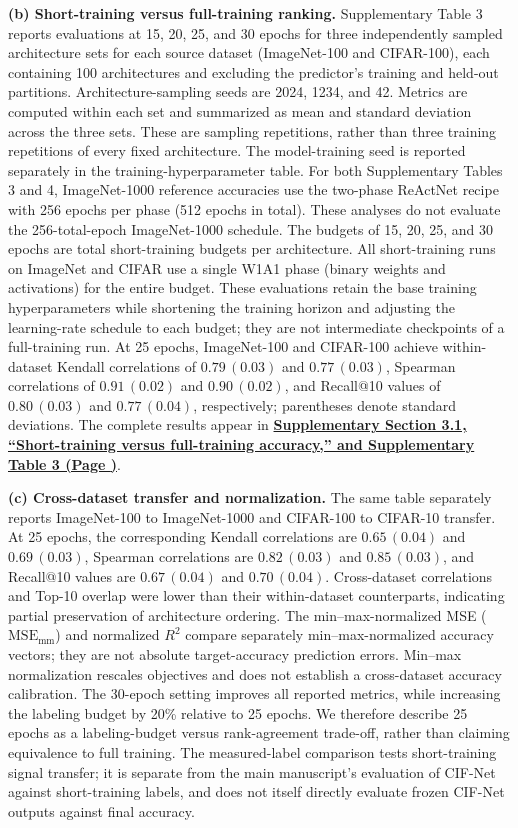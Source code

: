 \documentclass[11pt]{article}
\newcommand{\revloc}[1]{%
  \textcolor{revisionred}{\textbf{\uline{#1}}}}
\begin{document}
\begin{enumerate}[leftmargin=0pt,label={},itemsep=5mm]
\textbf{(b) Short-training versus full-training ranking.} Supplementary Table 3 reports evaluations at 15, 20, 25, and 30 epochs for three independently sampled architecture sets for each source dataset (ImageNet-100 and CIFAR-100), each containing 100 architectures and excluding the predictor's training and held-out partitions. Architecture-sampling seeds are 2024, 1234, and 42. Metrics are computed within each set and summarized as mean and standard deviation across the three sets. These are sampling repetitions, rather than three training repetitions of every fixed architecture. The model-training seed is reported separately in the training-hyperparameter table. For both Supplementary Tables 3 and 4, ImageNet-1000 reference accuracies use the two-phase ReActNet recipe with 256 epochs per phase (512 epochs in total). These analyses do not evaluate the 256-total-epoch ImageNet-1000 schedule. The budgets of 15, 20, 25, and 30 epochs are total short-training budgets per architecture. All short-training runs on ImageNet and CIFAR use a single W1A1 phase (binary weights and activations) for the entire budget. These evaluations retain the base training hyperparameters while shortening the training horizon and adjusting the learning-rate schedule to each budget; they are not intermediate checkpoints of a full-training run. At 25 epochs, ImageNet-100 and CIFAR-100 achieve within-dataset Kendall correlations of $0.79\,(0.03)$ and $0.77\,(0.03)$, Spearman correlations of $0.91\,(0.02)$ and $0.90\,(0.02)$, and Recall@10 values of $0.80\,(0.03)$ and $0.77\,(0.04)$, respectively; parentheses denote standard deviations. The complete results appear in \revloc{Supplementary Section 3.1, ``Short-training versus full-training accuracy,'' and Supplementary Table 3 (Page \underline{\hspace{1cm}})}.

\textbf{(c) Cross-dataset transfer and normalization.} The same table separately reports ImageNet-100 to ImageNet-1000 and CIFAR-100 to CIFAR-10 transfer. At 25 epochs, the corresponding Kendall correlations are $0.65\,(0.04)$ and $0.69\,(0.03)$, Spearman correlations are $0.82\,(0.03)$ and $0.85\,(0.03)$, and Recall@10 values are $0.67\,(0.04)$ and $0.70\,(0.04)$. Cross-dataset correlations and Top-10 overlap were lower than their within-dataset counterparts, indicating partial preservation of architecture ordering. The min--max-normalized MSE ($\mathrm{MSE}_{\mathrm{mm}}$) and normalized $R^2$ compare separately min--max-normalized accuracy vectors; they are not absolute target-accuracy prediction errors. Min--max normalization rescales objectives and does not establish a cross-dataset accuracy calibration. The 30-epoch setting improves all reported metrics, while increasing the labeling budget by 20\% relative to 25 epochs. We therefore describe 25 epochs as a labeling-budget versus rank-agreement trade-off, rather than claiming equivalence to full training. The measured-label comparison tests short-training signal transfer; it is separate from the main manuscript's evaluation of CIF-Net against short-training labels, and does not itself directly evaluate frozen CIF-Net outputs against final accuracy.


\end{enumerate}
\end{document}
